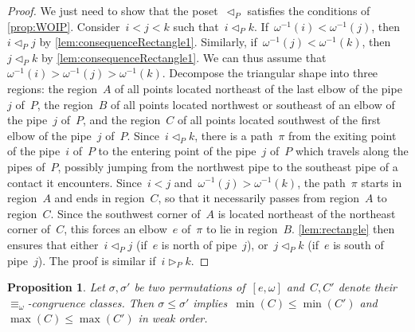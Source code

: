\documentclass[reqno]{amsart}
\newtheorem{proposition}[theorem]{Proposition}
\theoremstyle{definition}
\newcommand{\less}{\vartriangleleft} %
\newcommand{\more}{\vartriangleright} %
\newcommand{\contactLess}[1]{\less_{#1}} %
\newcommand{\contactMore}[1]{\more_{#1}} %
\begin{document}
\begin{proof}
We just need to show that the poset~$\contactLess{P}$ satisfies the conditions of \cref{prop:WOIP}.
Consider~$i < j < k$ such that~$i \contactLess{P} k$.
If~$\omega^{-1}(i) < \omega^{-1}(j)$, then~$i \contactLess{P} j$ by \cref{lem:consequenceRectangle1}.
Similarly, if~$\omega^{-1}(j) < \omega^{-1}(k)$, then~$j \contactLess{P} k$ by \cref{lem:consequenceRectangle1}.
We can thus assume that~${\omega^{-1}(i) > \omega^{-1}(j) > \omega^{-1}(k)}$.
Decompose the triangular shape into three regions: the region~$A$ of all points located northeast of the last elbow of the pipe~$j$ of~$P$, the region~$B$ of all points located northwest or southeast of an elbow of the pipe~$j$ of~$P$, and the region~$C$ of all points located southwest of the first elbow of the pipe~$j$ of~$P$.
Since~$i \contactLess{P} k$, there is a path~$\pi$ from the exiting point of the pipe~$i$ of~$P$ to the entering point of the pipe~$j$ of~$P$ which travels along the pipes of~$P$, possibly jumping from the northwest pipe to the southeast pipe of a contact it encounters.
Since~$i < j$ and~$\omega^{-1}(j) > \omega^{-1}(k)$, the path~$\pi$ starts in region~$A$ and ends in region~$C$, so that it necessarily passes from region~$A$ to region~$C$.
Since the southwest corner of~$A$ is located northeast of the northeast corner of~$C$, this forces an elbow~$e$ of~$\pi$ to lie in region~$B$.
\cref{lem:rectangle} then ensures that either~$i \contactLess{P} j$ (if~$e$ is north of pipe~$j$), or~$j \contactLess{P} k$ (if~$e$ is south of pipe~$j$).
The proof is similar if~$i \contactMore{P} k$.
\end{proof}

\begin{proposition}
\label{prop:orderPreserving}
Let $\sigma, \sigma'$ be two permutations of~$[e, \omega]$ and~$C, C'$ denote their $\equiv_\omega$-congruence classes.
Then $\sigma \le \sigma'$ implies~$\min(C) \le \min(C')$ and $\max(C) \le \max(C')$ in weak order.
\end{proposition}
\end{document}
